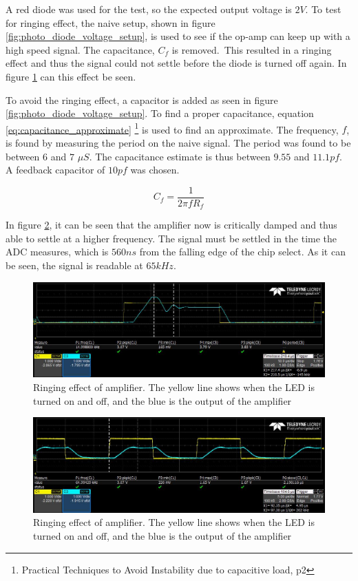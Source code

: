 A red diode was used for the test, so the expected output voltage is $2 V$.
To test for ringing effect, the naive setup, shown in figure \ref{fig:photo_diode_voltage_setup}, 
is used to see if the op-amp can keep up with a high speed signal. The capacitance, $C_f$ is removed.\
This resulted in a ringing effect and thus the signal could not settle before the diode is turned off again.
In figure \ref{fig::scope_op_amp_no_C} can this effect be seen.


To avoid the ringing effect, a capacitor is added as seen in figure \ref{fig:photo_diode_voltage_setup}.
To find a proper capacitance, equation \ref{eq:capacitance_approximate}
\footnote{Practical Techniques to Avoid Instability due to capacitive load, p2}
is used to find an approximate.
The frequency, $f$, is found by measuring the period on the naive signal.
The period was found to be between $6$ and $7$ $\mu S$.
The capacitance estimate is thus between $9.55$ and $11.1 pf$. 
A feedback capacitor of $10 pf$ was chosen.

\begin{equation}
 C_f = \frac{1}{2 \pi f R_f} \label{eq:capacitance_approximate}
\end{equation}

In figure \ref{fig::scope_op_amp_with_C}, it can be seen that the amplifier now is critically damped and thus able to settle at a higher frequency.
The signal must be settled in the time the ADC measures, which is $560 ns$ from the falling edge of the chip select.
As it can be seen, the signal is readable at $65 kHz$.

\begin{figure}[h]
\includegraphics[width=0.9\linewidth]{img/amp_test_ringing1.jpg}
\caption{Ringing effect of amplifier. The yellow line shows when the LED is turned on and off, and the blue is the output of the amplifier}
\label{fig::scope_op_amp_no_C}
\end{figure}


\begin{figure}[h]
\includegraphics[width=0.9\linewidth]{img/ringing_test_filtered_rise.jpg}
\caption{Ringing effect of amplifier. The yellow line shows when the LED is turned on and off, and the blue is the output of the amplifier}
\label{fig::scope_op_amp_with_C}
\end{figure}

